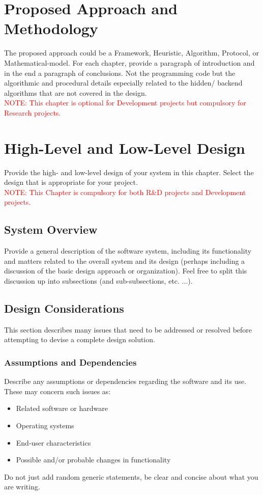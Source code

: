 \documentclass{FastFyp}
\begin{document}
\chapter{Proposed Approach and Methodology}
The proposed approach could be a Framework, Heuristic, Algorithm, Protocol, or Mathematical-model.
For each chapter, provide a paragraph of introduction and in the end a paragraph of conclusions. Not the programming code but the algorithmic and procedural details especially related to the hidden/ backend algorithms that are not covered in the design.\\
\textcolor{red}{NOTE: This chapter is optional for Development projects but compulsory for Research projects.} 
\chapter{High-Level and Low-Level Design}
Provide the high- and low-level design of your system in this chapter. Select the design that is appropriate for your project.\\
\textcolor{red}{NOTE: This Chapter is compulsory for both R\&D projects and Development projects.}
\section{System Overview}
Provide a general description of the software system, including its functionality and matters related to the overall system and its design (perhaps including a discussion of the basic design approach or organization). Feel free to split this discussion up into subsections (and sub-subsections, etc. ...).
\section{Design Considerations}
This section describes many issues that need to be addressed or resolved before attempting to devise a complete design solution.
\subsection{Assumptions and Dependencies}
Describe any assumptions or dependencies regarding the software and its use. These may concern such issues as:
\begin{itemize}
\item Related software or hardware 
  \item Operating systems 
  \item End-user characteristics 
  \item Possible and/or probable changes in functionality
\end{itemize}
Do not just add random generic statements, be clear and concise about what you are writing.
\end{document}
